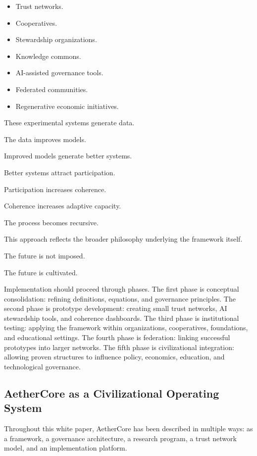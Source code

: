 \documentclass[12pt]{article}
\begin{document}
\begin{itemize}
  \item Trust networks.
  \item Cooperatives.
  \item Stewardship organizations.
  \item Knowledge commons.
  \item AI-assisted governance tools.
  \item Federated communities.
  \item Regenerative economic initiatives.
\end{itemize}

These experimental systems generate data.

The data improves models.

Improved models generate better systems.

Better systems attract participation.

Participation increases coherence.

Coherence increases adaptive capacity.

The process becomes recursive.

This approach reflects the broader philosophy underlying the framework itself.

The future is not imposed.

The future is cultivated.

Implementation should proceed through phases. The first phase is conceptual consolidation: refining definitions, equations, and governance principles. The second phase is prototype development: creating small trust networks, AI stewardship tools, and coherence dashboards. The third phase is institutional testing: applying the framework within organizations, cooperatives, foundations, and educational settings. The fourth phase is federation: linking successful prototypes into larger networks. The fifth phase is civilizational integration: allowing proven structures to influence policy, economics, education, and technological governance.

\subsection{AetherCore as a Civilizational Operating System}

Throughout this white paper, AetherCore has been described in multiple ways: as a framework, a governance architecture, a research program, a trust network model, and an implementation platform.
\end{document}
